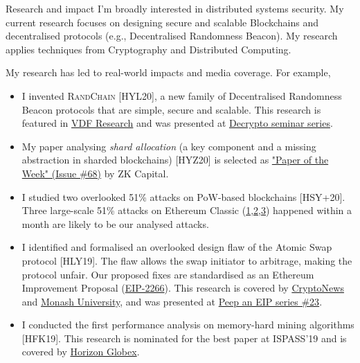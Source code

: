 \documentclass{resume} %
\begin{document}
\begin{rSection}{Research and impact}
    I'm broadly interested in distributed systems security.
    My current research focuses on designing secure and scalable Blockchains and decentralised protocols (e.g., Decentralised Randomness Beacon).
    My research applies techniques from Cryptography and Distributed Computing.

    My research has led to real-world impacts and media coverage. For example,
    \begin{itemize}
        \item I invented \textsc{RandChain} [HYL20], a new family of Decentralised Randomness Beacon protocols that are simple, secure and scalable. This research is featured in \href{https://vdfresearch.org/}{VDF Research} and was presented at \href{https://decrypto.org/seminar/}{Decrypto seminar series}.
        \item My paper analysing \emph{shard allocation} (a key component and a missing abstraction in sharded blockchains) [HYZ20] is selected as \href{https://zkcapital.substack.com/}{"Paper of the Week" (Issue \#68)} by ZK Capital.
        \item I studied two overlooked 51\% attacks on PoW-based blockchains [HSY+20]. Three large-scale 51\% attacks on Ethereum Classic (\href{https://news.bitcoin.com/ethereum-classic-suffers-51-attack-again-delisting-risk-amplified}{1},\href{https://decrypt.co/40196/hackers-launch-third-51-attack-on-ethereum-classic-this-month}{2},\href{https://coingeek.com/over-1m-double-spent-in-latest-ethereum-classic-51-attack}{3}) happened within a month are likely to be our analysed attacks.
        \item I identified and formalised an overlooked design flaw of the Atomic Swap protocol [HLY19]. The flaw allows the swap initiator to arbitrage, making the protocol unfair. Our proposed fixes are standardised as an Ethereum Improvement Proposal (\href{https://github.com/ethereum/EIPs/issues/2266}{EIP-2266}). This research is covered by \href{https://cryptonews.com.au/monash-university-researchers-developing-cryptocurrency-transaction-platform}{CryptoNews} and \href{https://www.monash.edu/blockchain/news/to-realise-their-potential,-business-blockchains-must-learn-to-communicate}{Monash University}, and was presented at \href{https://www.youtube.com/watch?v=wwWcfl9N65k}{Peep an EIP series \#23}.
        \item I conducted the first performance analysis on memory-hard mining algorithms [HFK19]. This research is nominated for the best paper at ISPASS'19 and is covered by \href{https://medium.com/@horizonfintex/blockchain-research-bytes-1-9d023e080765}{Horizon Globex}.
    \end{itemize}


\end{rSection}
\end{document}
